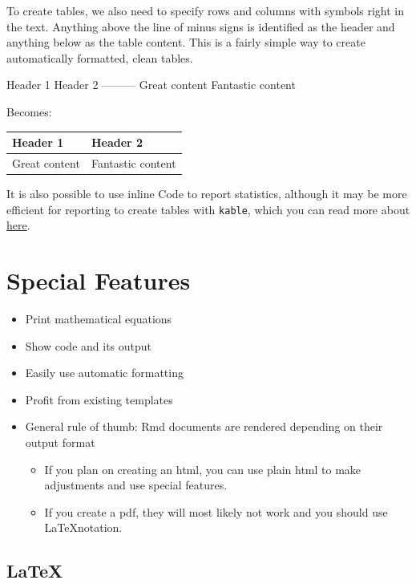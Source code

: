 \documentclass[
]{book}
\providecommand{\tightlist}{%
  \setlength{\itemsep}{0pt}\setlength{\parskip}{0pt}}
\begin{document}
To create tables, we also need to specify rows and columns with symbols right in the text.
Anything above the line of minus signs is identified as the header and anything below as the table content.
This is a fairly simple way to create automatically formatted, clean tables.

Header 1 \textbar{} Header 2
-----\textbar-----
Great content \textbar{} Fantastic content

Becomes:

\begin{longtable}[]{@{}ll@{}}
\toprule\noalign{}
Header 1 & Header 2 \\
\midrule\noalign{}
\endhead
\bottomrule\noalign{}
\endlastfoot
Great content & Fantastic content \\
\end{longtable}

It is also possible to use inline Code to report statistics, although it may be more efficient for reporting to create tables with \texttt{kable}, which you can read more about \href{https://cran.r-project.org/web/packages/kableExtra/vignettes/awesome_table_in_html.html}{here}.

\section{Special Features}\label{special-features}

\begin{itemize}
\tightlist
\item
  Print mathematical equations
\item
  Show code and its output
\item
  Easily use automatic formatting
\item
  Profit from existing templates
\item
  General rule of thumb: Rmd documents are rendered depending on their output format

  \begin{itemize}
  \tightlist
  \item
    If you plan on creating an html, you can use plain html to make adjustments and use special features.
  \item
    If you create a pdf, they will most likely not work and you should use \LaTeX notation.
  \end{itemize}
\end{itemize}

\subsection{\texorpdfstring{\LaTeX}{}}\label{section}
\end{document}
